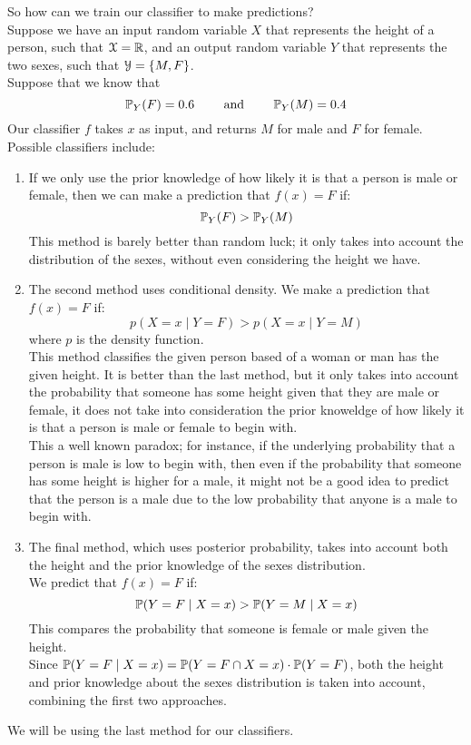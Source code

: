 \documentclass[12pt]{article}
\begin{document}
So how can we train
our classifier to make predictions? \\
Suppose we have an input
random variable $X$
that represents the height of a person,
such that $\mathcal{X} = \mathbb{R}$,
and an output random variable $Y$
that represents the two sexes,
such that $\mathcal{Y} = \{ M, F \}$. \\
Suppose that we know that
\[ \mathbb{P}_Y(F) = 0.6 \qquad \text{ and } 
\qquad \mathbb{P}_Y(M) = 0.4 \]
Our classifier $f$ takes $x$
as input,
and returns $M$ for male and $F$
for female. \\
Possible classifiers include:
\begin{enumerate}
    \item 
    If we only use the prior knowledge
    of how likely it is that a person
    is male or female,
    then we can make a prediction
    that $f(x) = F$
    if:
    \[ \mathbb{P}_Y(F) > \mathbb{P}_Y(M) \]
    This method is barely better
    than random luck; it only takes
    into account the distribution
    of the sexes, without even considering
    the height we have.
    \item
    The second method uses conditional
    density.
    We make a prediction that $f(x) = F$
    if:
    \[ p(X = x \mid Y = F)
    > p(X = x \mid Y = M) \]
    where $p$ is the density function. \\
    This method classifies the
    given person based
    of a woman or man has the given
    height.
    It is better than the last method,
    but it only takes into account
    the probability that someone
    has some height given that they
    are male or female,
    it does not take into consideration
    the prior knoweldge of how
    likely it is that a person
    is male or female to begin with. \\
    This a well known paradox;
    for instance,
    if the underlying probability
    that a person is male is low
    to begin with,
    then even if the probability
    that someone has some height
    is higher for a male,
    it might not be a good idea
    to predict that the person 
    is a male due to the low
    probability that anyone
    is a male to begin with. 
    \item
    The final method,
    which uses posterior probability,
    takes into account both
    the height and the prior knowledge
    of the sexes distribution. \\
    We predict that $f(x) = F$
    if:
    \[ \mathbb{P}(Y = F \mid X = x)
    > \mathbb{P}(Y = M \mid X = x) \]
    This compares the probability
    that someone is female or male
    given the height. \\
    Since $\mathbb{P}(Y = F \mid X = x)
    = \mathbb{P}(Y = F \cap X = x) 
    \cdot \mathbb{P}(Y = F)$,
    both the height and prior knowledge
    about the sexes distribution
    is taken into account,
    combining the first two approaches.
\end{enumerate}
We will be using the last method
for our classifiers. \\
\end{document}
